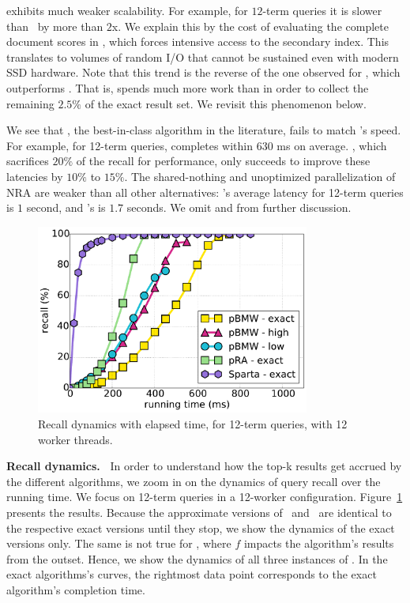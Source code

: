 \pRA\/ exhibits much weaker scalability. For example, for $12$-term queries it is slower than \alg\
by more than $2$x. We explain this by the cost of evaluating the complete 
document scores in \pRA, which forces  intensive access to the secondary index. This translates to volumes of random 
I/O that cannot be sustained even with modern SSD hardware. Note that this trend is the reverse of the one observed for \pRA\ex, 
which outperforms \alg\ex\/. That is, \alg\/ spends much more work than \pRA\/ 
in order to collect the remaining $2.5\%$ of the exact result set. We revisit this phenomenon  below. 


We see that 
\pBMW, the best-in-class algorithm in the literature, fails to match \alg's speed. For example, for 12-term queries, 
\pBMW\hi\/ completes  within $630$ ms on average. \pBMW\lo, 
which sacrifices $20\%$ of the recall for performance, only succeeds to improve these latencies by $10\%$ to $15\%$.
The shared-nothing and unoptimized parallelization of NRA are weaker than all other alternatives:
\pNRA's  average latency for 12-term queries is $1$ second, and \sNRA's is $1.7$ seconds. 
We omit \pNRA\/ and \sNRA\/ from further discussion. 

\begin{figure}[tbh]
\centering
\includegraphics[width=9cm]{figures/cumulative_12threads_clueweb.pdf}
\caption{Recall dynamics with elapsed time, for 12-term queries, with 12 worker threads.}
\label{fig:dynamics}
\end{figure}

{\bf Recall dynamics.\ } 
In order to understand how the top-k results get accrued by the different algorithms, we zoom in on the dynamics of query 
recall over the running time. We focus on 12-term queries in a 12-worker configuration. 
Figure~\ref{fig:dynamics} presents the results. 
Because the approximate versions of \alg\ and \pRA\ are  identical to the respective exact versions until they stop, 
we show the dynamics of the exact versions only.  The same is not true for \pBMW, where $f$ impacts the algorithm's results from the outset.
Hence, we show the dynamics of all three instances of \pBMW. 
In the exact algorithms's curves, the rightmost data point corresponds to the exact algorithm's completion time.   

